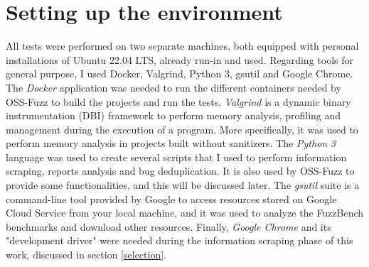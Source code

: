 \newpage
\section{Setting up the environment}

 

All tests were performed on two separate machines, both equipped with personal installations of Ubuntu 22.04 LTS, already run-in and used.
\newline \newline \newline
Regarding tools for general purpose, I used Docker, Valgrind, Python 3, gsutil and Google Chrome.
\newline \newline
The \textit{Docker} \cite{Docker} application was needed to run the different containers needed by OSS-Fuzz to build the projects and run the tests.
\newline \newline
\textit{Valgrind} \cite{Valgrind_1}\cite{Valgrind_2} is a dynamic binary instrumentation (DBI) framework to perform memory analysis, profiling and management during the execution of a program.
More specifically, it was used to perform memory analysis in projects built without sanitizers.
\newline \newline
The \textit{Python 3} language was used to create several scripts that I used to perform information scraping, reports analysis and bug deduplication.
It is also used by OSS-Fuzz to provide some functionalities, and this will be discussed later. 
\newline \newline
The \textit{gsutil} suite is a command-line tool provided by Google to access resources stored on Google Cloud Service from your local machine, and it was used to analyze the FuzzBench benchmarks and download other resources.
\newline \newline
Finally, \textit{Google Chrome} and its "development driver" were needed during the information scraping phase of this work, discussed in section \ref{selection}.
\newline \newline \newline

